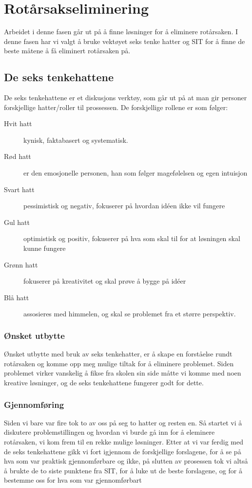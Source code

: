 \chapter{Rotårsakseliminering}
Arbeidet i denne fasen går ut på å finne løsninger for å eliminere rotårsaken. I denne fasen har vi valgt å bruke vektøyet seks tenke hatter og SIT for å finne de beste måtene å få eliminert rotårsaken på. 

\section{De seks tenkehattene}
De seks tenkehattene er et diskusjons verktøy, som går ut på at man gir personer forskjellige hatter/roller til prossessen. De forskjellige rollene er som følger:
\begin{description}
    \item [Hvit hatt] kynisk, faktabasert og systematisk.
    \item [Rød hatt] er den emosjonelle personen, han som følger magefølelsen og egen intuisjon
    \item[Svart hatt] pessimistisk og negativ, fokuserer på hvordan idéen ikke vil
    fungere
    \item [Gul hatt] optimistisk og positiv, fokuserer på hva som skal til for at løsningen skal kunne fungere
    \item[Grønn hatt] fokuserer på kreativitet og skal prøve å bygge på idéer
    \item[Blå hatt] assosieres med himmelen, og skal se problemet fra et større perspektiv.
\end{description}

\subsection{Ønsket utbytte}
Ønsket utbytte med bruk av seks tenkehatter, er å skape en forståelse rundt rotårsaken og komme opp meg mulige tiltak for å eliminere problemet. Siden problemet virker vanskelig å fikse fra skolen sin side måtte vi komme med noen kreative løsninger, og de seks tenkehattene fungerer godt for dette.

\subsection{Gjennomføring}
Siden vi bare var fire tok to av oss på seg to hatter og resten en. Så startet vi å diskutere problemstillingen og hvordan vi burde gå inn for å eleminere rotårsaken, vi kom frem til en rekke mulige løsninger. Etter at vi var ferdig med de seks tenkehattene gikk vi fort igjennom de forskjellige forslagene, for å se på hva som var praktisk gjennomførbare og ikke, på slutten av prosessen tok vi altså å brukte de to siste punktene fra SIT, for å luke ut de beste forslagene, og for å bestemme oss for hva som var gjennomførbart

